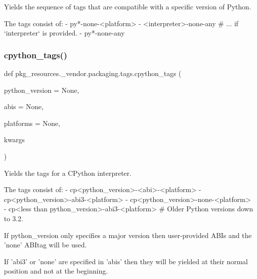 \begin{DoxyVerb}Yields the sequence of tags that are compatible with a specific version of Python.

The tags consist of:
- py*-none-<platform>
- <interpreter>-none-any  # ... if `interpreter` is provided.
- py*-none-any
\end{DoxyVerb}
 \mbox{\label{namespacepkg__resources_1_1__vendor_1_1packaging_1_1tags_a637f95a25b9983fe21707d9bdf3f7d9f}} 
\subsubsection{\texorpdfstring{cpython\+\_\+tags()}{cpython\_tags()}}
{\footnotesize\ttfamily def pkg\+\_\+resources.\+\_\+vendor.\+packaging.\+tags.\+cpython\+\_\+tags (\begin{DoxyParamCaption}\item[{}]{python\+\_\+version = {\ttfamily None},  }\item[{}]{abis = {\ttfamily None},  }\item[{}]{platforms = {\ttfamily None},  }\item[{}]{kwargs }\end{DoxyParamCaption})}

\begin{DoxyVerb}Yields the tags for a CPython interpreter.

The tags consist of:
- cp<python_version>-<abi>-<platform>
- cp<python_version>-abi3-<platform>
- cp<python_version>-none-<platform>
- cp<less than python_version>-abi3-<platform>  # Older Python versions down to 3.2.

If python_version only specifies a major version then user-provided ABIs and
the 'none' ABItag will be used.

If 'abi3' or 'none' are specified in 'abis' then they will be yielded at
their normal position and not at the beginning.
\end{DoxyVerb}
 \mbox{\label{namespacepkg__resources_1_1__vendor_1_1packaging_1_1tags_a4148a99666809c2dfcf4cc7771274dd6}} 
